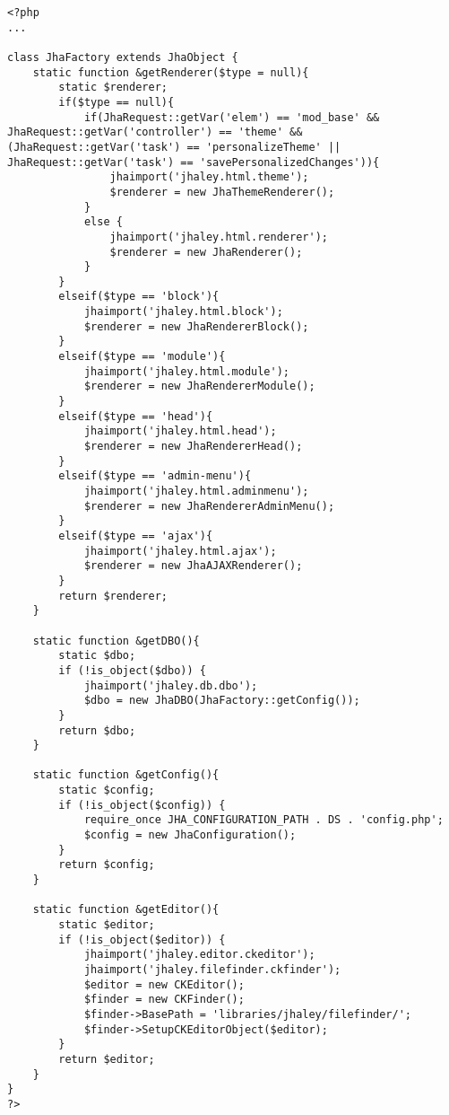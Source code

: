 \begin{lstlisting}[label=jha_factory,caption=Clase JhaFactory]
<?php
...

class JhaFactory extends JhaObject {
    static function &getRenderer($type = null){
        static $renderer;
       	if($type == null){
       		if(JhaRequest::getVar('elem') == 'mod_base' && JhaRequest::getVar('controller') == 'theme' && (JhaRequest::getVar('task') == 'personalizeTheme' || JhaRequest::getVar('task') == 'savePersonalizedChanges')){
       			jhaimport('jhaley.html.theme'); 
	            $renderer = new JhaThemeRenderer();
       		}
       		else {
	            jhaimport('jhaley.html.renderer'); 
	            $renderer = new JhaRenderer();
       		}
       	}
       	elseif($type == 'block'){
       		jhaimport('jhaley.html.block'); 
            $renderer = new JhaRendererBlock();
       	}
       	elseif($type == 'module'){
            jhaimport('jhaley.html.module'); 
            $renderer = new JhaRendererModule();
        }
        elseif($type == 'head'){
            jhaimport('jhaley.html.head'); 
            $renderer = new JhaRendererHead();
        }
        elseif($type == 'admin-menu'){
            jhaimport('jhaley.html.adminmenu'); 
            $renderer = new JhaRendererAdminMenu();
        }
        elseif($type == 'ajax'){
            jhaimport('jhaley.html.ajax'); 
            $renderer = new JhaAJAXRenderer();
        }
        return $renderer;
    }
    
	static function &getDBO(){
        static $dbo;
        if (!is_object($dbo)) {
            jhaimport('jhaley.db.dbo');             
            $dbo = new JhaDBO(JhaFactory::getConfig());
        }
        return $dbo;
    }
    
	static function &getConfig(){
        static $config;
        if (!is_object($config)) {
            require_once JHA_CONFIGURATION_PATH . DS . 'config.php'; 
            $config = new JhaConfiguration();
        }
        return $config;
    }
    
    static function &getEditor(){
        static $editor;
        if (!is_object($editor)) {
            jhaimport('jhaley.editor.ckeditor');
            jhaimport('jhaley.filefinder.ckfinder');
            $editor = new CKEditor();
            $finder = new CKFinder();
			$finder->BasePath = 'libraries/jhaley/filefinder/';
			$finder->SetupCKEditorObject($editor);
        }
        return $editor;
    }
}
?>
\end{lstlisting}
